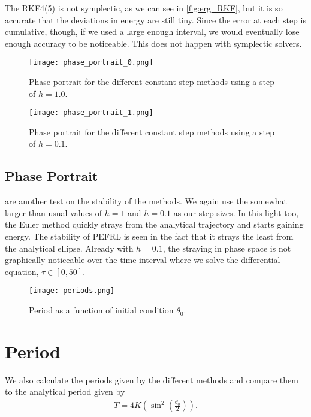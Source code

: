 \documentclass[10pt,a4paper,twocolumn]{article}
\begin{document}
The RKF4(5) is not symplectic, as we can see in \cref{fig:erg_RKF}, but it is so accurate that the deviations in energy are still tiny. Since the error at each step is cumulative, though, if we used a large enough interval, we would eventually lose enough accuracy to be noticeable. This does not happen with symplectic solvers.


\begin{figure}
    \centering
    \captionsetup{justification=centering}
    \texttt{[image: phase\_portrait\_0.png]}
    \caption{Phase portrait for the different constant step methods using a step of $h = 1.0$.}
    \label{fig:phase_portrait_0}
\end{figure}

\begin{figure}
    \centering
    \captionsetup{justification=centering}
    \texttt{[image: phase\_portrait\_1.png]}
    \caption{Phase portrait for the different constant step methods using a step of $h = 0.1$.}
    \label{fig:phase_portrait_1}
\end{figure}

\subsection{Phase Portrait}

 are another test on the stability of the methods. We again use the somewhat larger than usual values of $h = 1$ and $h = 0.1$ as our step sizes. In this light too, the Euler method quickly strays from the analytical trajectory and starts gaining energy. The stability of PEFRL is seen in the fact that it strays the least from the analytical ellipse. Already with $h = 0.1$, the straying in phase space is not graphically noticeable over the time interval where we solve the differential equation, $\tau \in [0, 50]$.


\begin{figure}
    \centering
    \captionsetup{justification=centering}
    \texttt{[image: periods.png]}
    \caption{Period as a function of initial condition $\theta_0$.}
    \label{fig:periods}
\end{figure}

\section{Period}

We also calculate the periods given by the different methods and compare them to the analytical period given by
%
\begin{align}
    T = 4 K \left( \sin^2 \left( \frac{\theta_0}{2} \right) \right).
\end{align}
\end{document}
